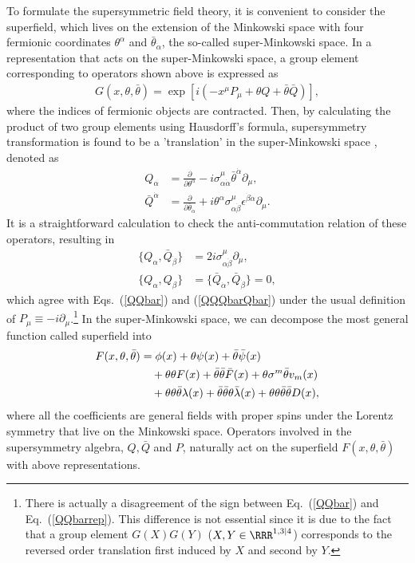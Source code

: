 \documentclass[12pt,twoside,book]{article}
\begin{document}
To formulate the supersymmetric field theory, it is convenient to consider the superfield, which lives on the extension of the Minkowski space with four fermionic coordinates $\theta^\alpha$ and $\bar{\theta}_{\dot{\alpha}}$, the so-called super-Minkowski space.
In a representation that acts on the super-Minkowski space, a group element corresponding to operators shown above is expressed as
\begin{align}
 G(x,\theta,\bar{\theta}) = \exp \left[ i \left( -x^\mu P_\mu + \theta Q + \bar{\theta} \bar{Q} \right) \right],
\end{align}
where the indices of fermionic objects are contracted.  Then, by
calculating the product of two group elements using Hausdorff's formula,
supersymmetry transformation is found to be a 'translation' in the
super-Minkowski space \cite{Salam:1981xd, Ferrara:1974ac}, denoted as
\begin{align}
 Q_\alpha &= \frac{\partial}{\partial \theta^\alpha} - i\sigma_{\alpha
 \dot{\alpha}}^\mu \bar{\theta}^{\dot{\alpha}} \partial_\mu,\label{Qrep} \\
 \bar{Q}^{\dot{\alpha}} &= \frac{\partial}{\partial
 \bar{\theta}_{\dot{\alpha}}} + i\theta^\alpha
 \sigma_{\alpha\dot{\beta}}^\mu \epsilon^{\dot{\beta} \dot{\alpha}}
 \partial_\mu.
\end{align}
It is a straightforward calculation to check the anti-commutation
relation of these operators, resulting in
\begin{align}
 \{ Q_\alpha, \bar{Q}_{\dot{\beta}} \} &= 2i\sigma_{\alpha
 \dot{\beta}}^\mu \partial_\mu,\label{QQbarrep} \\
 \{ Q_\alpha, Q_\beta \} &= \{ \bar{Q}_{\dot{\alpha}},
 \bar{Q}_{\dot{\beta}} \} = 0,
\end{align}
which agree with Eqs.\ (\ref{QQbar}) and (\ref{QQQbarQbar}) under the
usual definition of $P_\mu \equiv -i\partial_\mu$.\footnote{There is
actually a disagreement of the sign between Eq.\ (\ref{QQbar}) and Eq.\
(\ref{QQbarrep}).  This difference is not essential since it is due to
the fact that a group element $G(X) G(Y)$ ($X,Y \in \RRR^{1,3|4}$)
corresponds to the reversed order translation first induced by $X$ and
second by $Y$.}  In the super-Minkowski space, we can decompose the most
general function called superfield into
\begin{align}
 F(x,\theta,\bar{\theta}) &= \phi(x) + \theta \psi(x) + \bar{\theta}
 \bar{\psi}(x) \notag \\
 &\quad + \theta\theta F(x) + \bar{\theta}\bar{\theta} \bar{F}(x) +
 \theta \sigma^m \bar{\theta} v_m(x) \notag \\
 &\quad + \theta\theta\bar{\theta} \lambda(x) +
 \bar{\theta}\bar{\theta}\theta \bar{\lambda}(x) +
 \theta\theta\bar{\theta}\bar{\theta} D(x),
\end{align}
where all the coefficients are general fields with proper spins under
the Lorentz symmetry that live on the Minkowski space.  Operators
involved in the supersymmetry algebra, $Q,\bar{Q}$ and $P$, naturally
act on the superfield $F(x,\theta,\bar{\theta})$ with above
representations.
\end{document}
